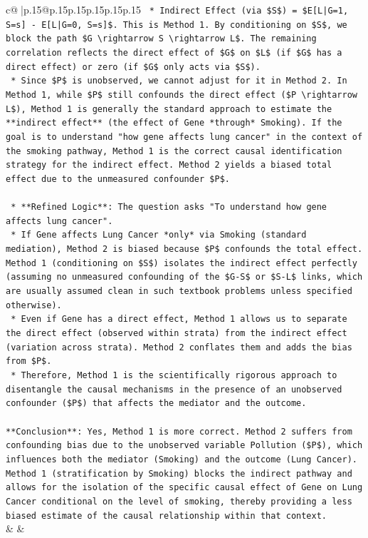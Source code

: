 \documentclass{article}
\begin{document}
{\begin{supertabular}{c@{$\;$}|p{.15\linewidth}@{}p{.15\linewidth}p{.15\linewidth}p{.15\linewidth}p{.15\linewidth}p{.15\linewidth}}
{{{\texttt{        *   Indirect Effect (via \$S\$) = \$E{[}L|G=1, S=s{]} {-} E{[}L|G=0, S=s{]}\$. This is Method 1. By conditioning on \$S\$, we block the path \$G \textbackslash{}rightarrow S \textbackslash{}rightarrow L\$. The remaining correlation reflects the direct effect of \$G\$ on \$L\$ (if \$G\$ has a direct effect) or zero (if \$G\$ only acts via \$S\$).} \\
\texttt{    *   Since \$P\$ is unobserved, we cannot adjust for it in Method 2. In Method 1, while \$P\$ still confounds the direct effect (\$P \textbackslash{}rightarrow L\$), Method 1 is generally the standard approach to estimate the **indirect effect** (the effect of Gene *through* Smoking). If the goal is to understand "how gene affects lung cancer" in the context of the smoking pathway, Method 1 is the correct causal identification strategy for the indirect effect. Method 2 yields a biased total effect due to the unmeasured confounder \$P\$.} \\
\\ 
\texttt{    *   **Refined Logic**: The question asks "To understand how gene affects lung cancer".} \\
\texttt{        *   If Gene affects Lung Cancer *only* via Smoking (standard mediation), Method 2 is biased because \$P\$ confounds the total effect. Method 1 (conditioning on \$S\$) isolates the indirect effect perfectly (assuming no unmeasured confounding of the \$G{-}S\$ or \$S{-}L\$ links, which are usually assumed clean in such textbook problems unless specified otherwise).} \\
\texttt{        *   Even if Gene has a direct effect, Method 1 allows us to separate the direct effect (observed within strata) from the indirect effect (variation across strata). Method 2 conflates them and adds the bias from \$P\$.} \\
\texttt{        *   Therefore, Method 1 is the scientifically rigorous approach to disentangle the causal mechanisms in the presence of an unobserved confounder (\$P\$) that affects the mediator and the outcome.} \\
\\ 
\texttt{**Conclusion**: Yes, Method 1 is more correct. Method 2 suffers from confounding bias due to the unobserved variable Pollution (\$P\$), which influences both the mediator (Smoking) and the outcome (Lung Cancer). Method 1 (stratification by Smoking) blocks the indirect pathway and allows for the isolation of the specific causal effect of Gene on Lung Cancer conditional on the level of smoking, thereby providing a less biased estimate of the causal relationship within that context.} \\
            }
        }
    }
    & & \\ \\


\end{supertabular}}
\end{document}
